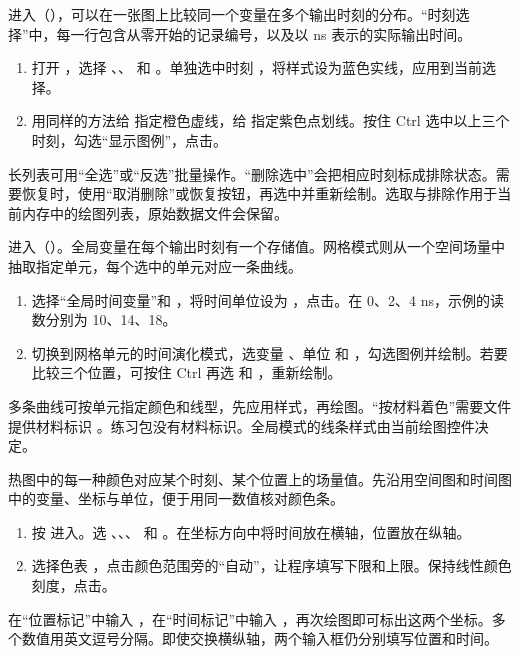 进入（），可以在一张图上比较同一个变量在多个输出时刻的分布。“时刻选择”中，每一行包含从零开始的记录编号，以及以 ns 表示的实际输出时间。
\begin{enumerate}
\item 打开 ，选择 、、 和 。单独选中时刻 ，将样式设为蓝色实线，应用到当前选择。
\item 用同样的方法给  指定橙色虚线，给  指定紫色点划线。按住 Ctrl 选中以上三个时刻，勾选“显示图例”，点击。
\end{enumerate}
长列表可用“全选”或“反选”批量操作。“删除选中”会把相应时刻标成排除状态。需要恢复时，使用“取消删除”或恢复按钮，再选中并重新绘制。选取与排除作用于当前内存中的绘图列表，原始数据文件会保留。

进入（）。全局变量在每个输出时刻有一个存储值。网格模式则从一个空间场量中抽取指定单元，每个选中的单元对应一条曲线。
\begin{enumerate}
\item 选择“全局时间变量”和 ，将时间单位设为 ，点击。在 0、2、4 ns，示例的读数分别为 10、14、18。
\item 切换到网格单元的时间演化模式，选变量 、单位  和 ，勾选图例并绘制。若要比较三个位置，可按住 Ctrl 再选  和 ，重新绘制。
\end{enumerate}
多条曲线可按单元指定颜色和线型，先应用样式，再绘图。“按材料着色”需要文件提供材料标识 。练习包没有材料标识。全局模式的线条样式由当前绘图控件决定。

热图中的每一种颜色对应某个时刻、某个位置上的场量值。先沿用空间图和时间图中的变量、坐标与单位，便于用同一数值核对颜色条。
\begin{enumerate}
\item 按  进入。选 、、、 和 。在坐标方向中将时间放在横轴，位置放在纵轴。
\item 选择色表 ，点击颜色范围旁的“自动”，让程序填写下限和上限。保持线性颜色刻度，点击。
\end{enumerate}
在“位置标记”中输入 ，在“时间标记”中输入 ，再次绘图即可标出这两个坐标。多个数值用英文逗号分隔。即使交换横纵轴，两个输入框仍分别填写位置和时间。


